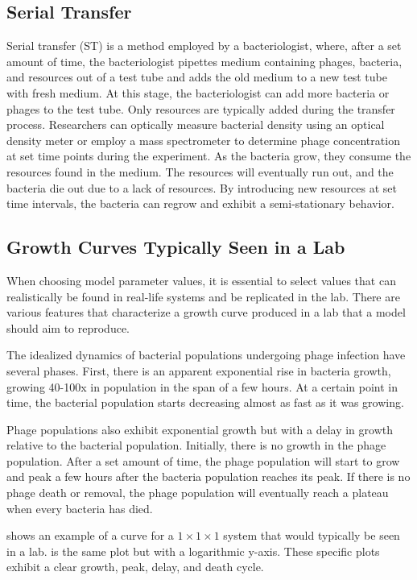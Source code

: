 \subsection{Serial Transfer}
Serial transfer (ST) is a method employed by a bacteriologist, where, after a set amount of time, the bacteriologist pipettes medium containing phages, bacteria, and resources out of a test tube and adds the old medium to a new test tube with fresh medium.
At this stage, the bacteriologist can add more bacteria or phages to the test tube. 
Only resources are typically added during the transfer process. 
Researchers can optically measure bacterial density using an optical density meter or employ a mass spectrometer to determine phage concentration at set time points during the experiment. 
As the bacteria grow, they consume the resources found in the medium.
The resources will eventually run out, and the bacteria die out due to a lack of resources.
By introducing new resources at set time intervals, the bacteria can regrow and exhibit a semi-stationary behavior.

\subsection{Growth Curves Typically Seen in a Lab}
\label{sec:literaturereview:growth_curves_typically_seen_in_a_lab}
When choosing model parameter values, it is essential to select values that can realistically be found in real-life systems and be replicated in the lab. 
There are various features that characterize a growth curve produced in a lab that a model should aim to reproduce. 

The idealized dynamics of bacterial populations undergoing phage infection have several phases. 
First, there is an apparent exponential rise in bacteria growth, growing 40-100x in population in the span of a few hours. 
At a certain point in time, the bacterial population starts decreasing almost as fast as it was growing. 

Phage populations also exhibit exponential growth but with a delay in growth relative to the bacterial population. 
Initially, there is no growth in the phage population. 
After a set amount of time, the phage population will start to grow and peak a few hours after the bacteria population reaches its peak. 
If there is no phage death or removal, the phage population will eventually reach a plateau when every bacteria has died. 

 shows an example of a curve for a $1\times1\times1$ system that would typically be seen in a lab. 
 is the same plot but with a logarithmic y-axis. 
These specific plots exhibit a clear growth, peak, delay, and death cycle. 

